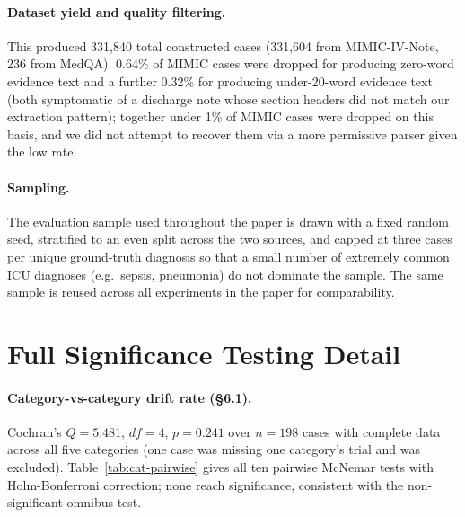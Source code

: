 \documentclass[pmlr,twocolumn,10pt]{jmlr} %
\begin{document}
\paragraph{Dataset yield and quality filtering.} This produced 331,840
total constructed cases (331,604 from MIMIC-IV-Note, 236 from MedQA).
0.64\% of MIMIC cases were dropped for producing zero-word evidence text
and a further 0.32\% for producing under-20-word evidence text (both
symptomatic of a discharge note whose section headers did not match our
extraction pattern); together under 1\% of MIMIC cases were dropped on
this basis, and we did not attempt to recover them via a more permissive
parser given the low rate.

\paragraph{Sampling.} The evaluation sample used throughout the paper is
drawn with a fixed random seed, stratified to an even split across the
two sources, and capped at three cases per unique ground-truth diagnosis
so that a small number of extremely common ICU diagnoses (e.g.\ sepsis,
pneumonia) do not dominate the sample. The same sample is reused across
all experiments in the paper for comparability.

\section{Full Significance Testing Detail}
\label{apd:stats}

\paragraph{Category-vs-category drift rate (\S6.1).} Cochran's $Q=5.481$,
$df=4$, $p=0.241$ over $n=198$ cases with complete data across all five
categories (one case was missing one category's trial and was excluded).
Table~\ref{tab:cat-pairwise} gives all ten pairwise McNemar tests with
Holm-Bonferroni correction; none reach significance, consistent with the
non-significant omnibus test.
\end{document}
